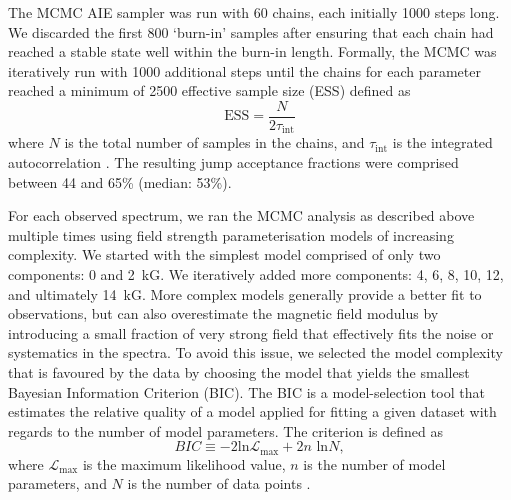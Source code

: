 \documentclass{aa}
\begin{document}
The MCMC AIE sampler was run with 60 chains, each initially 1000 steps long. We discarded the first 800 `burn-in' samples after ensuring that each chain had reached a stable state well within the burn-in length. Formally, the MCMC was iteratively run with 1000 additional steps until the chains for each parameter reached a minimum of 2500 effective sample size (ESS) defined as
$$ \text{ESS} =\frac{N}{2\tau_{\text{int}}}  $$
where $N$ is the total number of samples in the chains, and $\tau_{\text{int}}$ is the integrated autocorrelation \citep[][section 3.7.1]{sharma2017}. The resulting jump acceptance fractions were comprised between 44 and 65\% (median: 53\%).

For each observed spectrum, we ran the MCMC analysis as described above multiple times using field strength parameterisation models of increasing complexity. We started with the simplest model comprised of only two components: 0 and 2~kG. We iteratively added more components: 4, 6, 8, 10, 12, and ultimately 14~kG. More complex models generally provide a better fit to observations, but can also overestimate the magnetic field modulus by introducing a small fraction of very strong field that effectively fits the noise or systematics in the spectra. To avoid this issue, we selected the model complexity that is favoured by the data by choosing the model that yields the smallest Bayesian Information Criterion (BIC). The BIC is a model-selection tool that estimates the relative quality of a model applied for fitting a given dataset with regards to the number of model parameters. The criterion is defined as $$BIC \equiv -2 \text{ln}\mathcal{L}_{\text{max}} +2 n\text{ ln}N,$$ where $\mathcal{L}_{\text{max}}$ is the maximum likelihood value, $n$ is the number of model parameters, and $N$ is the number of data points  \citep{sharma2017}.
\end{document}
